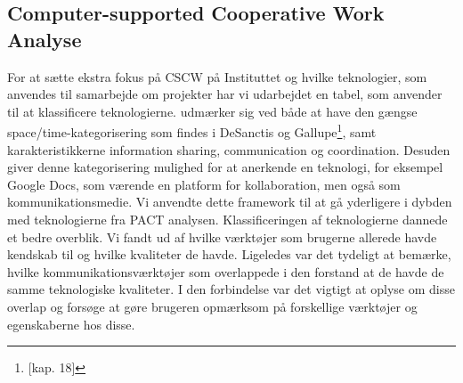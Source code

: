 \subsection{Computer-supported Cooperative Work Analyse}
For at sætte ekstra fokus på CSCW på Instituttet og hvilke teknologier, som anvendes til samarbejde om projekter har vi udarbejdet en tabel, som anvender \citep{Penichet} til at klassificere teknologierne. \citep{Penichet} udmærker sig ved både at have den gængse space/time-kategorisering som findes i DeSanctis og Gallupe\footnote{\citep{Benyon}[kap. 18]}, samt karakteristikkerne information sharing, communication og coordination. Desuden giver denne kategorisering mulighed for at anerkende en teknologi, for eksempel Google Docs, som værende en platform for kollaboration, men også som kommunikationsmedie. 
Vi anvendte dette framework til at gå yderligere i dybden med teknologierne fra PACT analysen. Klassificeringen af teknologierne dannede et bedre overblik. Vi fandt ud af hvilke værktøjer som brugerne allerede havde kendskab til og hvilke kvaliteter de havde. Ligeledes var det tydeligt at bemærke, hvilke kommunikationsværktøjer som overlappede i den forstand at de havde de samme teknologiske kvaliteter. I den forbindelse var det vigtigt at oplyse om disse overlap og forsøge at gøre brugeren opmærksom på forskellige værktøjer og egenskaberne hos disse. 

